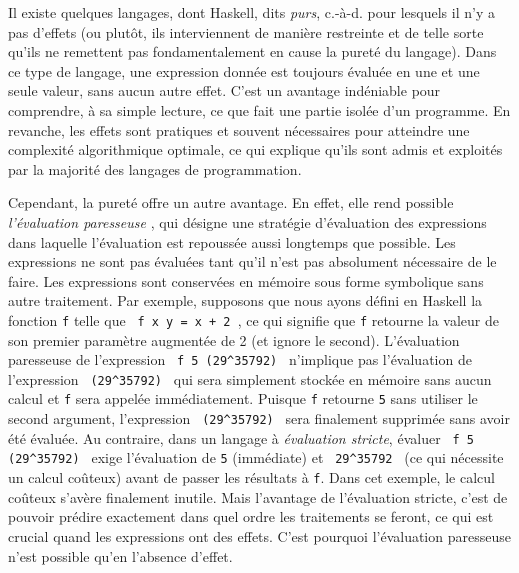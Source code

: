 \documentclass[a4paper,francais]{insalyon}
\newcommand{\cad}{c.-à-d.}
\begin{document}
Il existe quelques langages, dont Haskell, dits \emph{purs}, {\cad} pour lesquels il n'y a pas d'effets (ou plutôt, ils interviennent de manière restreinte et de telle sorte qu'ils ne remettent pas fondamentalement en cause la pureté du langage). Dans ce type de langage, une expression donnée est toujours évaluée en une et une seule valeur, sans aucun autre effet. C'est un avantage indéniable pour comprendre, à sa simple lecture, ce que fait une partie isolée d'un programme. En revanche, les effets sont pratiques et souvent nécessaires pour atteindre une complexité algorithmique optimale, ce qui explique qu'ils sont admis et exploités par la majorité des langages de programmation.    

Cependant, la pureté offre un autre avantage. En effet, elle rend possible \emph{l'évaluation paresseuse} \cite[Lecture 6: Lazy Evaluation]{coursHaskell}, qui désigne une stratégie d'évaluation des expressions dans laquelle l'évaluation est repoussée aussi longtemps que possible. Les expressions ne sont pas évaluées tant qu'il n'est pas absolument nécessaire de le faire. Les expressions sont conservées en mémoire sous forme symbolique sans autre traitement. Par exemple, supposons que nous ayons défini en Haskell la fonction \texttt{f} telle que \verb! f x y = x + 2 !, ce qui signifie que \texttt{f} retourne la valeur de son premier paramètre augmentée de 2 (et ignore le second). L'évaluation paresseuse de l'expression \verb! f 5 (29^35792) ! n'implique pas l'évaluation de l'expression \verb! (29^35792) ! qui sera simplement stockée en mémoire sans aucun calcul et \texttt{f} sera appelée immédiatement. Puisque \texttt{f} retourne \texttt{5} sans utiliser le second argument, l'expression \verb! (29^35792) ! sera finalement supprimée sans avoir été évaluée. Au contraire, dans un langage à \emph{évaluation stricte}, évaluer \verb! f 5 (29^35792) ! exige l'évaluation de \texttt{5} (immédiate) et \verb! 29^35792 ! (ce qui nécessite un calcul coûteux) avant de passer les résultats à \texttt{f}. Dans cet exemple, le calcul coûteux s'avère finalement inutile. Mais l'avantage de l'évaluation stricte, c'est de pouvoir prédire exactement dans quel ordre les traitements se feront, ce qui est crucial quand les expressions ont des effets. C'est pourquoi l'évaluation paresseuse n'est possible qu'en l'absence d'effet.
\end{document}
